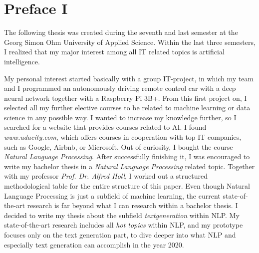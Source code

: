 \thispagestyle{empty}
\section*{Preface I}
\label{sec:prolog_1}

The following thesis was created during the seventh and last semester at the Georg Simon Ohm University of Applied Science. 
Within the last three semesters, I realized that my major interest among all IT related topics is artificial intelligence.

My personal interest started basically with a group IT-project, in which my team and I programmed an autonomously driving remote control car with a deep neural network together with a Raspberry Pi 3B+. From this first project on, I selected all my further elective courses to be related to machine learning or data science in any possible way. I wanted to increase my knowledge further, so I searched for a website that provides courses related to AI. I found \textit{www.udacity.com}, which offers courses in cooperation with top IT companies, such as Google, Airbnb, or Microsoft. Out of curiosity, I bought the course \textit{Natural Language Processing}. After successfully finishing it, I was encouraged to write my bachelor thesis in a \textit{Natural Language Processing} related topic. 
Together with my professor \textit{Prof. Dr. Alfred Holl}, I worked out a structured methodological table for the entire structure of this paper. 
Even though Natural Language Processing is just a subfield of machine learning, the current state-of-the-art research is far beyond what I can research within a bachelor thesis. I decided to write my thesis about the subfield \textit{textgeneration} within NLP. My state-of-the-art research includes all \textit{hot topics} within NLP, and my prototype focuses only on the text generation part, to dive deeper into what NLP and especially text generation can accomplish in the year 2020.
\null\newpage

